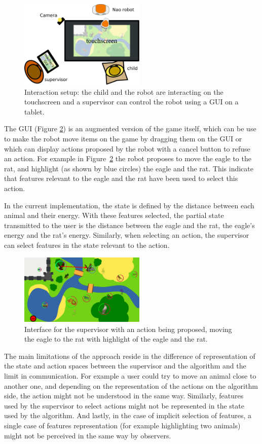 \documentclass[letterpaper]{article} %
\begin{document}
\begin{figure}
        \centering
  \includegraphics[width=60mm]{./figs/setup} 
    \caption{Interaction setup: the child and the robot are interacting on the
    touchscreen and a supervisor can control the robot using a GUI on a tablet.}
        \label{fig:setup}
\end{figure}


The GUI (Figure \ref{fig:gui}) is an augmented
version of the game itself, which can be use to make the robot move items on the
game by dragging them on the GUI or which can display actions proposed by the
robot with a cancel button to refuse an action. For example in
Figure~\ref{fig:gui} the robot proposes to move the eagle to the rat, and
highlight (as shown by blue circles) the eagle and the rat. This indicate that
features relevant to the eagle and the rat have been used to select this action.

In the current implementation, the state is defined by the distance between each
animal and their energy. With these features selected, the partial state
transmitted to the user is the distance between the eagle and the rat, the
eagle's energy and
the rat's energy. Similarly, when selecting an action, the supervisor can 
select features in the state relevant to the action.

\begin{figure}
        \centering
    \includegraphics[width=60mm]{./figs/proposition.png}
    \caption{Interface for the supervisor with an action being proposed, moving
        the eagle to the rat with highlight of the eagle and the rat.}
        \label{fig:gui}
\end{figure}


The main limitations of the approach reside in the difference of
representation of the state and action spaces between the supervisor and the
algorithm and the limit in communication. For example a user could try to move
an animal close to another one,
and depending on the representation of the actions on the algorithm side, the
action might not be understood in the same way. Similarly, features used by the
supervisor to select actions might not be represented in the state used by the
algorithm. And lastly, in the case of implicit selection of features, a single
case of features representation (for example highlighting two animals) might not
be perceived in the same way by observers.
\end{document}
